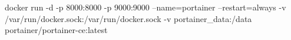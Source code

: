 docker run -d -p 8000:8000 -p 9000:9000 --name=portainer --restart=always -v /var/run/docker.sock:/var/run/docker.sock -v portainer_data:/data portainer/portainer-ce:latest
